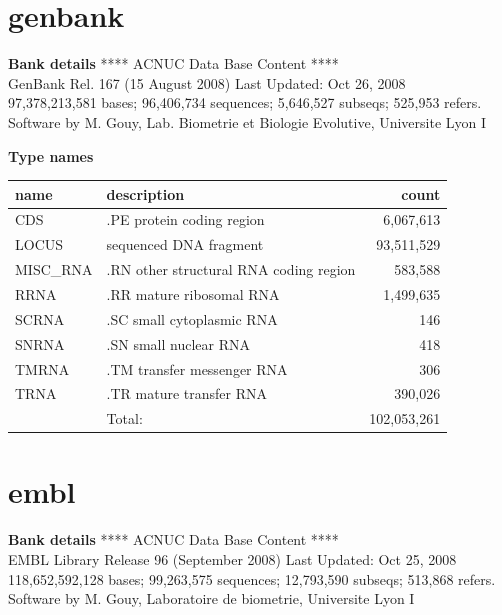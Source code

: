 \documentclass{article}
\begin{document}
\begin{Schunk}
\section{ genbank }
\textbf{Bank details}
             ****     ACNUC Data Base Content      ****                         \\
          GenBank Rel. 167 (15 August 2008) Last Updated: Oct 26, 2008\\
97,378,213,581 bases; 96,406,734 sequences; 5,646,527 subseqs; 525,953 refers.\\
Software by M. Gouy, Lab. Biometrie et Biologie Evolutive, Universite Lyon I 

\textbf{Type names}
\noindent\begin{tabular}{llr}
\hline \hline
name & description & count \\
\hline
CDS  &  .PE protein coding region  &  6,067,613 \\
LOCUS  &  sequenced DNA fragment  &  93,511,529 \\
MISC\_RNA  &  .RN other structural RNA coding region  &  583,588 \\
RRNA  &  .RR mature ribosomal RNA  &  1,499,635 \\
SCRNA  &  .SC small cytoplasmic RNA  &  146 \\
SNRNA  &  .SN small nuclear RNA  &  418 \\
TMRNA  &  .TM transfer messenger RNA  &  306 \\
TRNA  &  .TR mature transfer RNA  &  390,026 \\
\hline
 & Total: & 102,053,261 \\
\hline \hline
\end{tabular}

\section{ embl }
\textbf{Bank details}
             ****     ACNUC Data Base Content      ****                         \\
      EMBL Library Release 96 (September 2008) Last Updated: Oct 25, 2008\\
118,652,592,128 bases; 99,263,575 sequences; 12,793,590 subseqs; 513,868 refers.\\
Software by M. Gouy, Laboratoire de biometrie, Universite Lyon I 


\end{Schunk}
\end{document}
